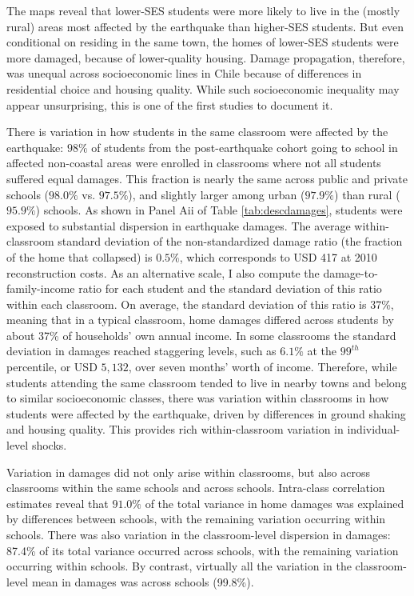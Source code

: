 The maps reveal that lower-SES students were more likely to live in the (mostly rural) areas most affected by the earthquake than higher-SES students. But even conditional on residing in the same town, the homes of lower-SES students were more damaged, because of lower-quality housing. Damage propagation, therefore, was unequal across socioeconomic lines in Chile because of differences in residential choice and housing  quality. While such socioeconomic inequality may appear unsurprising, this is one of the first studies to document it. \par 




There is variation in how students in the same classroom were affected by the earthquake: $98\%$ of students from the post-earthquake cohort going to school in affected non-coastal areas were enrolled in classrooms where not all students suffered equal damages. This fraction is nearly the same across public and private schools ($98.0\%$ vs. $97.5\%$), and slightly larger among urban ($97.9\%$) than rural ($95.9\%$) schools. As shown in Panel Aii of Table \ref{tab:descdamages}, students were exposed to substantial dispersion in earthquake damages. The average within-classroom standard deviation of the non-standardized damage ratio (the fraction of the home that collapsed) is $0.5\%$, which corresponds to USD 417 at 2010 reconstruction costs. As an alternative scale, I also compute the damage-to-family-income ratio for each student and the standard deviation of this ratio within each classroom. On average, the standard deviation of this ratio is 37\%, meaning that in a typical classroom, home damages differed across students by about 37\% of households' own annual income. In some classrooms the standard deviation in damages reached staggering levels, such as $6.1\%$  at the $99^{th}$ percentile, or USD $5,132$, over seven months' worth of income. Therefore, while students attending the same classroom tended to live in nearby towns and belong to similar socioeconomic classes, there was variation within classrooms in how students were affected by the earthquake, driven by differences in ground shaking and housing quality. This provides rich within-classroom variation in individual-level shocks.\par 

Variation in damages did not only arise within classrooms, but also across classrooms within the same schools and across schools. Intra-class correlation estimates reveal that $91.0\%$ of the total variance in home damages was explained by differences between schools, with the remaining variation occurring within schools. There was also variation in the classroom-level dispersion in damages: 87.4\% of its total variance occurred across schools, with the remaining variation occurring within schools. By contrast, virtually all the variation in the classroom-level mean in damages was across schools (99.8\%).\par 




